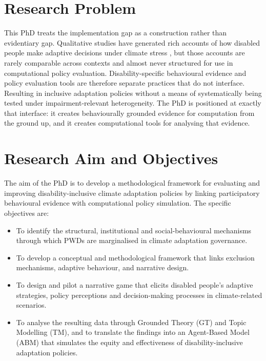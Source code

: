\documentclass[12pt,a4paper]{report}
\begin{document}
\section{Research Problem}
This PhD treats the implementation gap as a construction rather than evidentiary gap. Qualitative studies have generated rich accounts of how disabled people make adaptive decisions under climate stress \cite{quaill2019queensland,skaggs2025data}, but those accounts are rarely comparable across contexts and almost never structured for use in computational policy evaluation. Disability-specific behavioural evidence and policy evaluation tools are therefore separate practices that do not interface. Resulting in inclusive adaptation policies without a means of systematically being tested under impairment-relevant heterogeneity. The PhD is positioned at exactly that interface: it creates behaviourally grounded evidence for computation from the ground up, and it creates computational tools for analysing that evidence.
\section{Research Aim and Objectives}
The aim of the PhD is to develop a methodological framework for evaluating and improving disability-inclusive climate adaptation policies by linking participatory behavioural evidence with computational policy simulation. The specific objectives are:
\begin{itemize}
    \item To identify the structural, institutional and social-behavioural mechanisms through which PWDs are marginalised in climate adaptation governance.
    \item To develop a conceptual and methodological framework that links exclusion mechanisms, adaptive behaviour, and narrative design.
    \item To design and pilot a narrative game that elicits disabled people's adaptive strategies, policy perceptions and decision-making processes in climate-related scenarios.
    \item To analyse the resulting data through Grounded Theory (GT) and Topic Modelling (TM), and to translate the findings into an Agent-Based Model (ABM) that simulates the equity and effectiveness of disability-inclusive adaptation policies.
\end{itemize}
\end{document}
